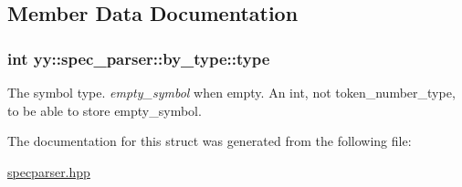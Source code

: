 \subsection{Member Data Documentation}
\subsubsection[{\texorpdfstring{type}{type}}]{\setlength{\rightskip}{0pt plus 5cm}int yy\+::spec\+\_\+parser\+::by\+\_\+type\+::type}\hypertarget{structyy_1_1spec__parser_1_1by__type_a1ee34e993a81e7912c0d7b3d5ce2bd58}{}\label{structyy_1_1spec__parser_1_1by__type_a1ee34e993a81e7912c0d7b3d5ce2bd58}
The symbol type. {\itshape empty\+\_\+symbol} when empty. An int, not token\+\_\+number\+\_\+type, to be able to store empty\+\_\+symbol. 

The documentation for this struct was generated from the following file\+:\begin{DoxyCompactItemize}
\item 
\hyperlink{specparser_8hpp}{specparser.\+hpp}\end{DoxyCompactItemize}
